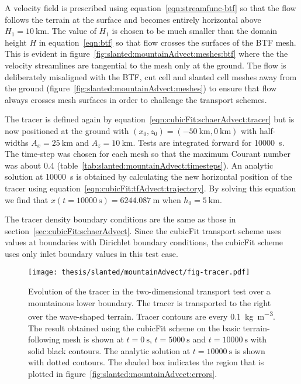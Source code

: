 A velocity field is prescribed using equation~\eqref{eqn:streamfunc-btf} so that the flow follows the terrain at the surface and becomes entirely horizontal above $H_1 = \SI{10}{\kilo\meter}$.
The value of $H_1$ is chosen to be much smaller than the domain height $H$ in equation~\eqref{eqn:btf} so that flow crosses the surfaces of the BTF mesh.
This is evident in figure~\ref{fig:slanted:mountainAdvect:meshes:btf} where the the velocity streamlines are tangential to the mesh only at the ground.
The flow is deliberately misaligned with the BTF, cut cell and slanted cell meshes away from the ground (figure~\ref{fig:slanted:mountainAdvect:meshes}) to ensure that flow always crosses mesh surfaces in order to challenge the transport schemes.

\begin{table}
	\centering
	
%
	\caption{Time-steps (\si{\second}) for the two-dimensional transport test over a mountainous lower boundary.  The time-steps were chosen so that the maximum Courant number was between \num{0.36} and \num{0.46}.}
	\label{tab:slanted:mountainAdvect:timesteps}
\end{table}

The tracer is defined again by equation~\eqref{eqn:cubicFit:schaerAdvect:tracer} but is now positioned at the ground with $(x_0, z_0) = (\SI{-50}{\kilo\meter}, \SI{0}{\kilo\meter})$ with half-widths $A_x = \SI{25}{\kilo\meter}$ and $A_z = \SI{10}{\kilo\meter}$.
Tests are integrated forward for \SI{10000}{\second}.  The time-step was chosen for each mesh so that the maximum Courant number was about \num{0.4} (table~\ref{tab:slanted:mountainAdvect:timesteps}).
An analytic solution at \SI{10000}{\second} is obtained by calculating the new horizontal position of the tracer using equation~\eqref{eqn:cubicFit:tfAdvect:trajectory}.
By solving this equation we find that \(x(t=\SI{10000}{\second}) = \SI{6244.087}{\meter}\) when $h_0 = \SI{5}{\kilo\meter}$.

The tracer density boundary conditions are the same as those in section~\ref{sec:cubicFit:schaerAdvect}.
Since the cubicFit transport scheme uses values at boundaries with Dirichlet boundary conditions, the cubicFit scheme uses only inlet boundary values in this test case.

\begin{figure}
	\centering
	\texttt{[image: thesis/slanted/mountainAdvect/fig-tracer.pdf]}
	\caption{Evolution of the tracer in the two-dimensional transport test over a mountainous lower boundary.  The tracer is transported to the right over the wave-shaped terrain.  Tracer contours are every \SI{0.1}{\kilo\gram\per\meter\cubed}.  The result obtained using the cubicFit scheme on the basic terrain-following mesh is shown at $t=\SI{0}{\second}$, $t=\SI{5000}{\second}$ and $t=\SI{10000}{\second}$ with solid black contours. The analytic solution at $t=\SI{10000}{\second}$ is shown with dotted contours.
	The shaded box indicates the region that is plotted in figure~\ref{fig:slanted:mountainAdvect:errors}.}
	\label{fig:slanted:mountainAdvect:tracer}
\end{figure}


